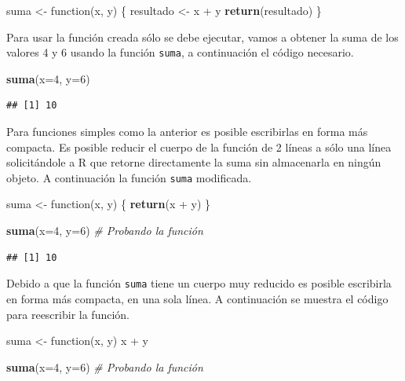 \documentclass[10pt,]{krantz}
\makeatletter
\newenvironment{Shaded}{\begin{snugshade}}{\end{snugshade}}
\newcommand{\KeywordTok}[1]{\textcolor[rgb]{0.13,0.29,0.53}{\textbf{{#1}}}}
\newcommand{\DataTypeTok}[1]{\textcolor[rgb]{0.13,0.29,0.53}{{#1}}}
\newcommand{\DecValTok}[1]{\textcolor[rgb]{0.00,0.00,0.81}{{#1}}}
\newcommand{\StringTok}[1]{\textcolor[rgb]{0.31,0.60,0.02}{{#1}}}
\newcommand{\CommentTok}[1]{\textcolor[rgb]{0.56,0.35,0.01}{\textit{{#1}}}}
\newcommand{\NormalTok}[1]{{#1}}
\let\proglang=\textsf
\newenvironment{kframe}{%
\medskip{}
\setlength{\fboxsep}{.8em}
 \def\at@end@of@kframe{}%
 \ifinner\ifhmode%
  \def\at@end@of@kframe{\end{minipage}}%
  \begin{minipage}{\columnwidth}%
 \fi\fi%
 \def\FrameCommand##1{\hskip\@totalleftmargin \hskip-\fboxsep
 \colorbox{shadecolor}{##1}\hskip-\fboxsep
     \hskip-\linewidth \hskip-\@totalleftmargin \hskip\columnwidth}%
 \MakeFramed {\advance\hsize-\width
   \@totalleftmargin\z@ \linewidth\hsize
   \@setminipage}}%
 {\par\unskip\endMakeFramed%
 \at@end@of@kframe}
\renewenvironment{Shaded}{\begin{kframe}}{\end{kframe}}
\makeatother
\begin{document}
\begin{Shaded}
\begin{Highlighting}[]
\NormalTok{suma <-}\StringTok{ }\NormalTok{function(x, y) \{}
  \NormalTok{resultado <-}\StringTok{ }\NormalTok{x +}\StringTok{ }\NormalTok{y}
  \KeywordTok{return}\NormalTok{(resultado)}
\NormalTok{\}}
\end{Highlighting}
\end{Shaded}

Para usar la función creada sólo se debe ejecutar, vamos a obtener la
suma de los valores 4 y 6 usando la función \texttt{suma}, a
continuación el código necesario.

\begin{Shaded}
\begin{Highlighting}[]
\KeywordTok{suma}\NormalTok{(}\DataTypeTok{x=}\DecValTok{4}\NormalTok{, }\DataTypeTok{y=}\DecValTok{6}\NormalTok{)}
\end{Highlighting}
\end{Shaded}

\begin{verbatim}
## [1] 10
\end{verbatim}

Para funciones simples como la anterior es posible escribirlas en forma
más compacta. Es posible reducir el cuerpo de la función de 2 líneas a
sólo una línea solicitándole a \proglang{R} que retorne directamente la
suma sin almacenarla en ningún objeto. A continuación la función
\texttt{suma} modificada.

\begin{Shaded}
\begin{Highlighting}[]
\NormalTok{suma <-}\StringTok{ }\NormalTok{function(x, y) \{}
  \KeywordTok{return}\NormalTok{(x +}\StringTok{ }\NormalTok{y)}
\NormalTok{\}}

\KeywordTok{suma}\NormalTok{(}\DataTypeTok{x=}\DecValTok{4}\NormalTok{, }\DataTypeTok{y=}\DecValTok{6}\NormalTok{)  }\CommentTok{# Probando la función}
\end{Highlighting}
\end{Shaded}

\begin{verbatim}
## [1] 10
\end{verbatim}

Debido a que la función \texttt{suma} tiene un cuerpo muy reducido es
posible escribirla en forma más compacta, en una sola línea. A
continuación se muestra el código para reescribir la función.

\begin{Shaded}
\begin{Highlighting}[]
\NormalTok{suma <-}\StringTok{ }\NormalTok{function(x, y) x +}\StringTok{ }\NormalTok{y}

\KeywordTok{suma}\NormalTok{(}\DataTypeTok{x=}\DecValTok{4}\NormalTok{, }\DataTypeTok{y=}\DecValTok{6}\NormalTok{)  }\CommentTok{# Probando la función}
\end{Highlighting}
\end{Shaded}
\end{document}
